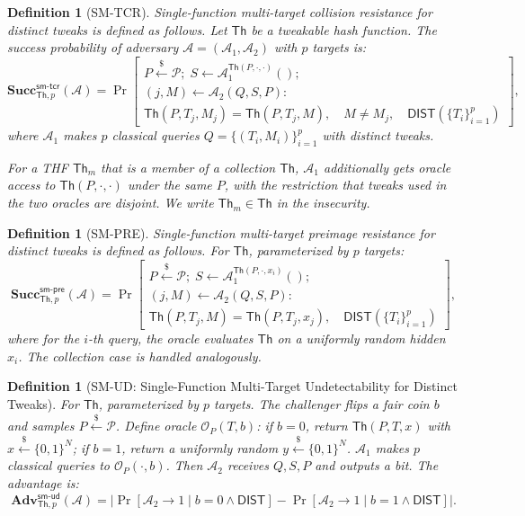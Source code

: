 \documentclass[11pt,a4paper]{article}
\newtheorem{definition}[theorem]{Definition}
\newcommand{\Th}{\mathsf{Th}}
\newcommand{\bits}{\{0,1\}}
\newcommand{\Succ}{\mathbf{Succ}}
\newcommand{\Adv}{\mathbf{Adv}}
\newcommand{\Nbits}{N}
\begin{document}
\begin{definition}[SM-TCR]
\label{def:sm-tcr}
Single-function multi-target collision resistance for distinct tweaks is defined as follows. Let $\Th$ be a tweakable hash function. The success probability of adversary $\mathcal{A}=(\mathcal{A}_1,\mathcal{A}_2)$ with $p$ targets is:
\[
\Succ_{\Th,p}^{\mathsf{sm\text{-}tcr}}(\mathcal{A}) = \Pr\left[
\begin{array}{l}
P \xleftarrow{\$} \mathcal{P}; \; S \gets \mathcal{A}_1^{\Th(P,\cdot,\cdot)}(); \\
(j, M) \gets \mathcal{A}_2(Q, S, P) :\\
\Th(P, T_j, M_j) = \Th(P, T_j, M),\quad
M \neq M_j,\quad \mathsf{DIST}(\{T_i\}_{i=1}^p)
\end{array}
\right],
\]
where $\mathcal{A}_1$ makes $p$ classical queries $Q=\{(T_i,M_i)\}_{i=1}^p$ with distinct tweaks.

For a THF $\Th_m$ that is a member of a collection $\boldsymbol{\Th}$, $\mathcal{A}_1$ additionally gets oracle access to $\boldsymbol{\Th}(P,\cdot,\cdot)$ under the same $P$, with the restriction that tweaks used in the two oracles are disjoint. We write $\Th_m \in \boldsymbol{\Th}$ in the insecurity.
\end{definition}

\begin{definition}[SM-PRE]
\label{def:sm-pre}
Single-function multi-target preimage resistance for distinct tweaks is defined as follows. For $\Th$, parameterized by $p$ targets:
\[
\Succ_{\Th,p}^{\mathsf{sm\text{-}pre}}(\mathcal{A}) = \Pr\left[
\begin{array}{l}
P \xleftarrow{\$} \mathcal{P}; \; S \gets \mathcal{A}_1^{\Th(P,\cdot,x_i)}(); \\
(j, M) \gets \mathcal{A}_2(Q, S, P) :\\
\Th(P, T_j, M) = \Th(P, T_j, x_j),\quad
\mathsf{DIST}(\{T_i\}_{i=1}^p)
\end{array}
\right],
\]
where for the $i$-th query, the oracle evaluates $\Th$ on a uniformly random hidden $x_i$. The collection case is handled analogously.
\end{definition}

\begin{definition}[SM-UD: Single-Function Multi-Target Undetectability for Distinct Tweaks]
\label{def:sm-ud}
For $\Th$, parameterized by $p$ targets. The challenger flips a fair coin $b$ and samples $P \xleftarrow{\$} \mathcal{P}$. Define oracle $\mathcal{O}_P(T, b)$: if $b=0$, return $\Th(P,T,x)$ with $x \xleftarrow{\$} \bits^\Nbits$; if $b=1$, return a uniformly random $y \xleftarrow{\$} \bits^\Nbits$. $\mathcal{A}_1$ makes $p$ classical queries to $\mathcal{O}_P(\cdot,b)$. Then $\mathcal{A}_2$ receives $Q, S, P$ and outputs a bit. The advantage is:
\[
\Adv_{\Th,p}^{\mathsf{sm\text{-}ud}}(\mathcal{A}) = \bigl|
\Pr[\mathcal{A}_2 \to 1 \mid b=0 \land \mathsf{DIST}] - \Pr[\mathcal{A}_2 \to 1 \mid b=1 \land \mathsf{DIST}]
\bigr|.
\]
\end{definition}
\end{document}
